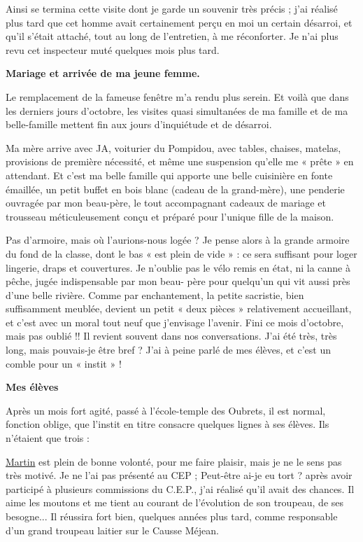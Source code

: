 Ainsi se termina cette visite dont je garde un souvenir très précis ; j’ai réalisé plus tard que cet
homme avait certainement perçu en moi un certain désarroi, et qu’il s’était attaché, tout au
long de l’entretien, à me réconforter. Je n’ai plus revu cet inspecteur muté quelques mois plus
tard.

\textbf{Mariage et arrivée de ma jeune femme.}

Le remplacement de la fameuse fenêtre m’a rendu plus serein. Et voilà que dans les derniers
jours d’octobre, les visites quasi simultanées de ma famille et de ma belle-famille mettent fin
aux jours d’inquiétude et de désarroi.

Ma mère arrive avec JA, voiturier du Pompidou, avec tables, chaises, matelas, provisions de
première nécessité, et même une suspension qu’elle me « prête » en attendant. Et c’est ma
belle famille qui apporte une belle cuisinière en fonte émaillée, un petit buffet en bois blanc
(cadeau de la grand-mère), une penderie ouvragée par mon beau-père, le tout accompagnant
cadeaux de mariage et trousseau méticuleusement conçu et préparé pour l’unique fille de la
maison.

Pas d’armoire, mais où l’aurions-nous logée ? Je pense alors à la grande armoire du fond de la
classe, dont le bas « est plein de vide » : ce sera suffisant pour loger lingerie, draps et
couvertures.
Je n’oublie pas le vélo remis en état, ni la canne à pêche, jugée indispensable par mon beau-
père pour quelqu’un qui vit aussi près d’une belle rivière.
Comme par enchantement, la petite sacristie, bien suffisamment meublée, devient un petit
« deux pièces » relativement accueillant, et c’est avec un moral tout neuf que j’envisage
l’avenir.
Fini ce mois d’octobre, mais pas oublié !! Il revient souvent dans nos conversations. J’ai été
très, très long, mais pouvais-je être bref ? J’ai à peine parlé de mes élèves, et c’est un comble
pour un « instit » !

\textbf{Mes élèves}

Après un mois fort agité, passé à l’école-temple des Oubrets, il est normal, fonction oblige,
que l’instit en titre consacre quelques lignes à ses élèves. Ils n’étaient que trois :

\underline{Martin} est plein de bonne volonté, pour me faire plaisir, mais je ne le sens pas très motivé. Je
ne l’ai pas présenté au CEP ; Peut-être ai-je eu tort ? après avoir participé à plusieurs
commissions du C.E.P., j’ai réalisé qu’il avait des chances. Il aime les moutons et me tient au
courant de l’évolution de son troupeau, de ses besogne... Il réussira fort bien, quelques années
plus tard, comme responsable d’un grand troupeau laitier sur le Causse Méjean.

